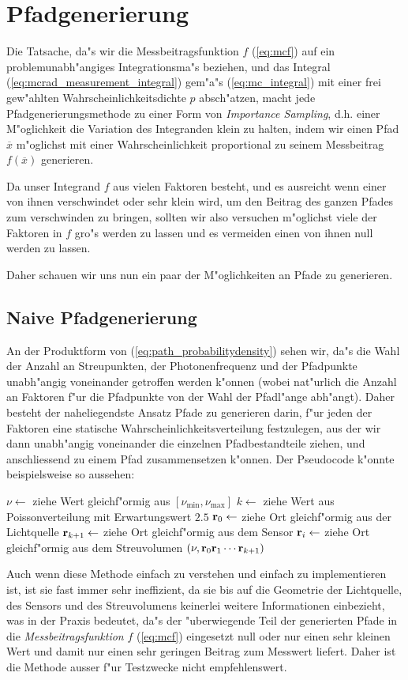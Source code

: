 	\section{Pfadgenerierung}
	Die Tatsache, da"s wir die Messbeitragsfunktion $f$ (\ref{eq:mcf}) auf ein problemunabh"angiges Integrationsma"s beziehen, und das Integral (\ref{eq:mcrad_measurement_integral}) gem"a"s (\ref{eq:mc_integral}) mit einer frei gew"ahlten Wahrscheinlichkeitsdichte $p$ absch"atzen, macht jede Pfadgenerierungsmethode zu einer Form von {\em Importance Sampling}, d.h. einer M"oglichkeit die Variation des Integranden klein zu halten, indem wir einen Pfad ${\overline x}$ m"oglichst mit einer Wahrscheinlichkeit proportional zu seinem Messbeitrag $f({\overline x})$ generieren.
	
	Da unser Integrand $f$ aus vielen Faktoren besteht, und es ausreicht wenn einer von ihnen verschwindet oder sehr klein wird, um den Beitrag des ganzen Pfades zum verschwinden zu bringen, sollten wir also versuchen m"oglichst viele der Faktoren in $f$ gro"s werden zu lassen und es vermeiden einen von ihnen null werden zu lassen.
	
	Daher schauen wir uns nun ein paar der M"oglichkeiten an Pfade zu generieren.
	\subsection{Naive Pfadgenerierung}
	An der Produktform von (\ref{eq:path_probabilitydensity}) sehen wir, da"s die Wahl der Anzahl an Streupunkten, der Photonenfrequenz und der Pfadpunkte unabh"angig voneinander getroffen werden k"onnen (wobei nat"urlich die Anzahl an Faktoren f"ur die Pfadpunkte von der Wahl der Pfadl"ange abh"angt). Daher besteht der naheliegendste Ansatz Pfade zu generieren darin, f"ur jeden der Faktoren eine statische Wahrscheinlichkeitsverteilung festzulegen, aus der wir dann unabh"angig voneinander die einzelnen Pfadbestandteile ziehen, und anschliessend zu einem Pfad zusammensetzen k"onnen. Der Pseudocode k"onnte beispielsweise so aussehen:
	\begin{algorithmic}
		\STATE $\nu \leftarrow$ ziehe Wert gleichf"ormig aus $[\nu_\text{min},\nu_\text{max}]$
		\STATE $k \leftarrow$ ziehe Wert aus Poissonverteilung mit Erwartungswert $2.5$
		\STATE $\mathbf{r}_0 \leftarrow$ ziehe Ort gleichf"ormig aus der Lichtquelle
		\STATE $\mathbf{r}_{k+1} \leftarrow$ ziehe Ort gleichf"ormig aus dem Sensor
			\STATE $\mathbf{r}_i \leftarrow$ ziehe Ort gleichf"ormig aus dem Streuvolumen
	  \ENDFOR
	  \RETURN $(\nu,\mathbf{r}_0\mathbf{r}_1\cdots\mathbf{r}_{k+1})$
	\end{algorithmic}
	Auch wenn diese Methode einfach zu verstehen und einfach zu implementieren ist, ist sie fast immer sehr ineffizient, da sie bis auf die Geometrie der Lichtquelle, des Sensors und des Streuvolumens keinerlei weitere Informationen einbezieht, was in der Praxis bedeutet, da"s der "uberwiegende Teil der generierten Pfade in die {\em Messbeitragsfunktion} $f$ (\ref{eq:mcf}) eingesetzt null oder nur einen sehr kleinen Wert und damit nur einen sehr geringen Beitrag zum Messwert liefert. Daher ist die Methode ausser f"ur Testzwecke nicht empfehlenswert.
	

